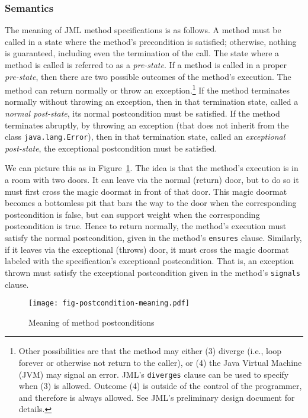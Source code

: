 \documentclass{jotarticle}
\begin{document}
\subsubsection{Semantics}

The meaning of JML method specifications is as follows.  A method must
be called in a state where the method's precondition is satisfied;
otherwise, nothing is guaranteed, including even the termination of
the call.  The state where a method is called is referred to as a
\emph{pre-state}.  If a method is called in a proper \emph{pre-state},
then there are two possible outcomes of the method's execution.  The
method can return normally or throw an exception.\footnote{
  Other
  possibilities are that the method may either (3) diverge (i.e., loop
  forever or otherwise not return to the caller), or (4) the
  Java Virtual Machine (JVM) may signal an error. JML's
  \texttt{diverges} clause can be used to specify when (3) is allowed.
  Outcome (4) is outside of the control of the programmer, and
  therefore is always allowed. See JML's preliminary design document
  \cite{Leavens-Baker-Ruby03} for details.}
If the method terminates normally without throwing an exception, 
then in that termination state, called a \emph{normal post-state},
its normal postcondition  must be satisfied. 
If the method terminates abruptly, by throwing an
exception (that does not inherit from the class
\texttt{java.lang.Error}),
then in that termination state, called an
\emph{exceptional post-state}, the exceptional postcondition 
must be satisfied.  

We can picture this as in Figure~\ref{fig-postcondition-meaning}.
The idea is that the method's execution is in a room with two doors.
It can leave via the normal (return) door, but to do so it must first
cross the magic doormat in front of that door.
This magic doormat becomes a bottomless pit that bars the way to the door
when the corresponding postcondition is false, but can support weight
when the corresponding postcondition is true.
Hence to return normally, the method's execution must satisfy the
normal postcondition, given in the method's \texttt{ensures} clause.
Similarly, if it leaves via the exceptional (throws) door, it must
cross the magic doormat labeled with the specification's exceptional
postcondition.
That is, an exception thrown must satisfy the exceptional postcondition
given in the method's \texttt{signals} clause.

\begin{figure}
\centerline{\texttt{[image: fig-postcondition-meaning.pdf]}}
\caption{Meaning of method postconditions}
\label{fig-postcondition-meaning}
\end{figure}
\end{document}
